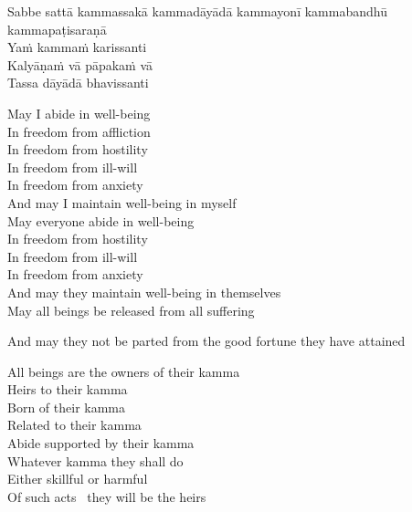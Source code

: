 Sabbe sattā kammassakā kammadāyādā kammayonī kammabandhū kammapaṭisaraṇā\\
Yaṁ kammaṁ karissanti\\
Kalyāṇaṁ vā pāpakaṁ vā\\
Tassa dāyādā bhavissanti

\clearpage

\begin{leader}
\end{leader}

\begin{english-verses}
  May I abide in well-being\\
  In freedom from affliction\\
  In freedom from hostility\\
  In freedom from ill-will\\
  In freedom from anxiety\\
  And may I maintain well-being in myself\\
  May everyone abide in well-being\\
  In freedom from hostility\\
  In freedom from ill-will\\
  In freedom from anxiety\\
  And may they maintain well-being in themselves\\
  May all beings be released from all suffering\\
\end{english-verses}
\begin{english-hang}
  And may they not be parted from the good fortune they have attained
\end{english-hang}
\begin{english-verses}
  All beings are the owners of their kamma\\
  Heirs to their kamma\\
  Born of their kamma\\
  Related to their kamma\\
  Abide supported by their kamma\\
  Whatever kamma they shall do\\
  Either skillful or harmful\\
  Of such acts \breathmark\ they will be the heirs\\
\end{english-verses}

